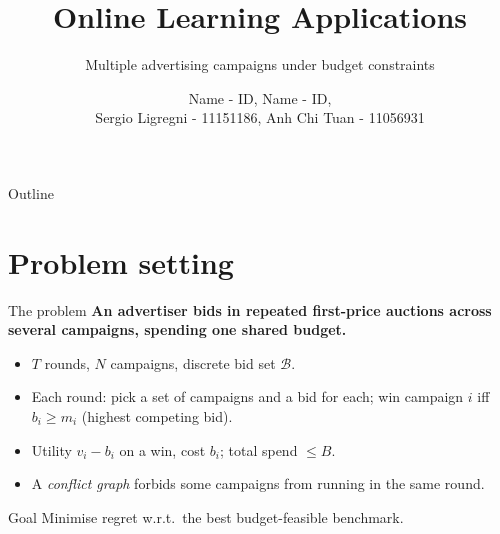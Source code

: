 \documentclass[12pt,aspectratio=169]{beamer}
\title{Online Learning Applications}
\subtitle{Multiple advertising campaigns under budget constraints}
\author{
  Name - ID,
  Name - ID,\\
  Sergio Ligregni - 11151186,
  Anh Chi Tuan - 11056931}
\institute{September 8\textsuperscript{\tiny{th}}, 2026 }
\begin{document}
\aurigatitleframe

\newcommand{\iid}{\stackrel{\tiny{iid}}{\sim}}
\newcommand{\ind}{\stackrel{\tiny{ind}}{\sim}}

\newcommand{\bidset}{\mathcal{B}}
\newcommand{\campaigns}{\mathcal{N}}
\newcommand{\superarms}{\mathcal{S}}
\newcommand{\OPT}{\mathrm{OPT}}
\newcommand{\ucb}{\widehat{f}^{\,\mathrm{UCB}}}
\newcommand{\lcb}{\widehat{c}^{\,\mathrm{LCB}}}

\newcommand{\figphx}[3]{%
  \fbox{\parbox[c][#2][c]{#1}{\centering\ttfamily\small #3}}}
\newcommand{\figph}[2][0.8\textwidth]{\figphx{#1}{3.2cm}{#2}}


\begin{frame}{Outline}
  \tableofcontents
\end{frame}


\section{Problem setting}

\begin{frame}{The problem}
\footnotesize
  \textbf{An advertiser bids in repeated first-price auctions across several campaigns, spending one shared budget.}
  \begin{itemize}
    \item $T$ rounds, $N$ campaigns, discrete bid set $\bidset$.
    \item Each round: pick a set of campaigns and a bid for each; win campaign $i$ iff
          $b_i \ge m_i$ (highest competing bid).
    \item Utility $v_i - b_i$ on a win, cost $b_i$; total spend $\le B$.
    \item A \emph{conflict graph} forbids some campaigns from running in the same round.
  \end{itemize}
  \begin{block}{Goal}
    Minimise regret w.r.t.\ the best budget-feasible benchmark.
  \end{block}
\end{frame}
\end{document}
